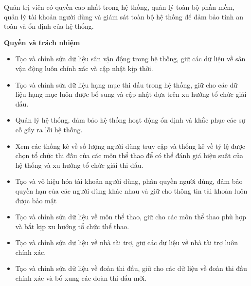 Quản trị viên có quyền cao nhất trong hệ thống,
quản lý toàn bộ phần mềm, quản lý tài khoản người dùng và
giám sát toàn bộ hệ thống để đảm bảo tính an toàn và ổn định của hệ thống.

\noindent
\textbf{Quyền và trách nhiệm}
\begin{itemize}[leftmargin=1.5cm, label={\textbf{--}}]
  \item Tạo và chỉnh sửa dữ liệu sân vận động trong hệ thống, giữ các dữ liệu về sân vận động luôn chính xác và cập nhật kịp thời.
  \item Tạo và chỉnh sửa dữ liệu hạng mục thi đấu trong hệ thống, giữ cho các dữ liệu hạng mục luôn được bổ sung và cập nhật dựa trên xu hướng tổ chức giải đấu.
  \item Quản lý hệ thống, đảm bảo hệ thống hoạt động ổn định và khắc phục các sự cố gây ra lỗi hệ thống.
  \item Xem các thống kê về số lượng người dùng truy cập và thống kê về tỷ lệ được chọn tổ chức thi đấu của các môn thể thao để có thể đánh giá hiệu suất của hệ thống và xu hướng tổ chức giải thi đấu.
  \item Tạo và vô hiệu hóa tài khoản người dùng, phân quyền người dùng, đảm bảo quyền hạn của các người dùng khác nhau và giữ cho thông tin tài khoản luôn được bảo mật
  \item Tạo và chỉnh sửa dữ liệu về môn thể thao, giữ cho các môn thể thao phù hợp và bắt kịp xu hướng tổ chức thể thao.
  \item Tạo và chỉnh sửa dữ liệu về nhà tài trợ, giữ các dữ liệu về nhà tài trợ luôn chính xác.
  \item Tạo và chỉnh sửa dữ liệu về đoàn thi đấu, giữ cho các dữ liệu về đoàn thi đấu chính xác và bổ xung các đoàn thi đấu mới.
\end{itemize}

